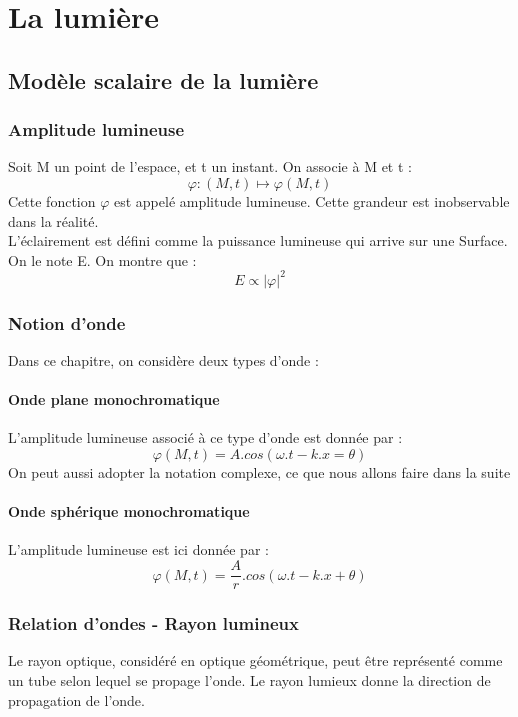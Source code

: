 \chapter{La lumière}
\section{Modèle scalaire de la lumière}
\subsection{Amplitude lumineuse}
Soit M un point de l'espace, et t un instant. On associe à M et t : 
$$\varphi : (M,t) \mapsto \varphi(M,t)$$
Cette fonction $\varphi$ est appelé amplitude lumineuse. Cette grandeur est inobservable dans la réalité.\\
L'éclairement est défini comme la puissance lumineuse qui arrive sur une Surface. On le note E. On montre que : 
$$E \propto |\varphi|^2 $$
\subsection{Notion d'onde}
Dans ce chapitre, on considère deux types d'onde : 
\subsubsection{Onde plane monochromatique}
L'amplitude lumineuse associé à ce type d'onde est donnée par : 
$$\varphi(M,t) = A.cos(\omega.t - k.x = \theta)$$
On peut aussi adopter la notation complexe, ce que nous allons faire dans la suite
\subsubsection{Onde sphérique monochromatique}
L'amplitude lumineuse est ici donnée par : 
$$\varphi(M,t) = \dfrac{A}{r}.cos(\omega.t - k.x + \theta)$$
\subsection{Relation d'ondes - Rayon lumineux}
Le rayon optique, considéré en optique géométrique, peut être représenté comme un tube selon lequel se propage l'onde. Le rayon lumieux donne la direction de propagation de l'onde.
